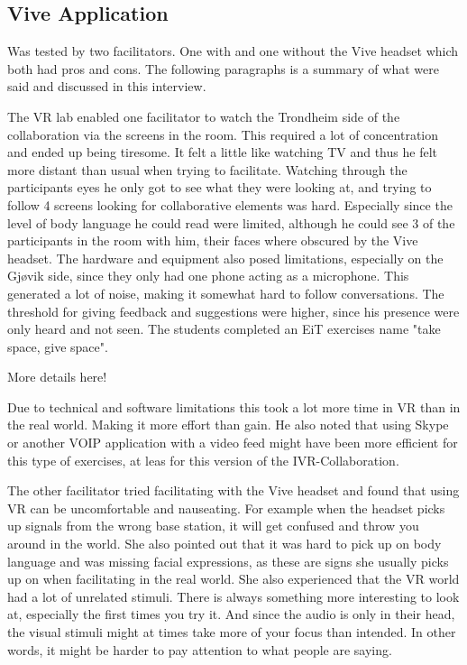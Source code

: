         \subsection{Vive Application} %
        Was tested by two facilitators. One with and one without the Vive headset which both had pros and cons. The following paragraphs is a summary of what were said and discussed in this interview.
        
        The VR lab enabled one facilitator to watch the Trondheim side of the collaboration via the screens in the room. This required a lot of concentration and ended up being tiresome. It felt a little like watching TV and thus he felt more distant than usual when trying to facilitate. Watching through the participants eyes he only got to see what they were looking at, and trying to follow 4 screens looking for collaborative elements was hard. Especially since the level of body language he could read were limited, although he could see 3 of the participants in the room with him, their faces where obscured by the Vive headset. The hardware and equipment also posed limitations, especially on the Gjøvik side, since they only had one phone acting as a microphone. This generated a lot of noise, making it somewhat hard to follow conversations. The threshold for giving feedback and suggestions were higher, since his presence were only heard and not seen. The students completed an EiT exercises name "take space, give space". 
        
        More details here!
        
        Due to technical and software limitations this took a lot more time in VR than in the real world. Making it more effort than gain. He also noted that using Skype or another VOIP application with a video feed might have been more efficient for this type of exercises, at leas for this version of the IVR-Collaboration.
        
        The other facilitator tried facilitating with the Vive headset and found that using VR can be uncomfortable and nauseating. For example when the headset picks up signals from the wrong base station, it will get confused and throw you around in the world. She also pointed out that it was hard to pick up on body language and was missing facial expressions, as these are signs she usually picks up on when facilitating in the real world. She also experienced that the VR world had a lot of unrelated stimuli. There is always something more interesting to look at, especially the first times you try it. And since the audio is only in their head, the visual stimuli might at times take more of your focus than intended. In other words, it might be harder to pay attention to what people are saying.
        
